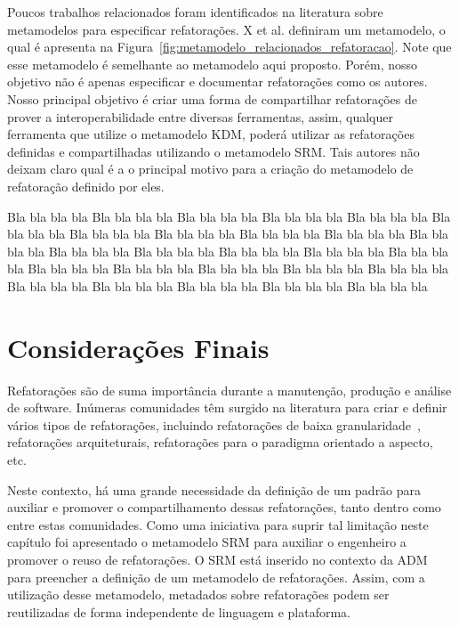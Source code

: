 Poucos trabalhos relacionados foram identificados na literatura sobre metamodelos para especificar refatorações. X et al. definiram um metamodelo, o qual é apresenta na Figura~\ref{fig:metamodelo_relacionados_refatoracao}. Note que esse metamodelo é semelhante ao metamodelo aqui proposto. Porém, nosso objetivo não é apenas especificar e documentar refatorações como os autores. Nosso principal objetivo é criar uma forma de compartilhar refatorações de prover a interoperabilidade entre diversas ferramentas, assim, qualquer ferramenta que utilize o metamodelo KDM, poderá utilizar as refatorações definidas e compartilhadas utilizando o metamodelo SRM. Tais autores não deixam claro qual é a o principal motivo para a criação do metamodelo de refatoração definido por eles.


Bla bla bla bla Bla bla bla bla Bla bla bla bla Bla bla bla bla Bla bla bla bla Bla bla bla bla Bla bla bla bla Bla bla bla bla Bla bla bla bla Bla bla bla bla Bla bla bla bla Bla bla bla bla Bla bla bla bla Bla bla bla bla Bla bla bla bla Bla bla bla bla Bla bla bla bla Bla bla bla bla Bla bla bla bla Bla bla bla bla Bla bla bla bla Bla bla bla bla Bla bla bla bla Bla bla bla bla Bla bla bla bla Bla bla bla bla 

\section{Considerações Finais}
\label{sec:consideracoes_finais_SRM}

Refatorações são de suma importância durante a manutenção, produção e análise de software. Inúmeras comunidades têm surgido na literatura para criar e definir vários tipos de refatorações, incluindo refatorações de baixa granularidade~\cite{Fowler1999, Demeyer1, Demeyer2}, refatorações arquiteturais, refatorações para o paradigma orientado a aspecto, etc. 

Neste contexto, há uma grande necessidade da definição de um padrão para auxiliar e promover o compartilhamento dessas refatorações, tanto dentro como entre estas comunidades. Como uma iniciativa para suprir tal limitação neste capítulo foi apresentado o metamodelo SRM para auxiliar o engenheiro a promover o reuso de refatorações. O SRM está inserido no contexto da ADM para preencher a definição de um metamodelo de refatorações. Assim, com a utilização desse metamodelo, metadados sobre refatorações podem ser reutilizadas de forma independente de linguagem e plataforma.

